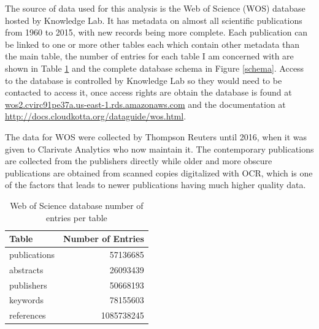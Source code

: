 \documentclass[12pt, a4paper]{article}
\begin{document}
The source of data used for this analysis is the  Web of Science (WOS) database hosted by Knowledge Lab. It has metadata on almost all scientific publications from 1960 to 2015, with new records being more complete. Each publication can be linked to one or more other tables each which contain other metadata than the main table, the number of entries for each table I am concerned with are shown in Table \ref{wos} and the complete database schema in Figure \ref{schema}. Access to the database is controlled by Knowledge Lab so they would need to be contacted to access it, once access rights are obtain the database is found at \href{wos2.cvirc91pe37a.us-east-1.rds.amazonaws.com}{wos2.cvirc91pe37a.us-east-1.rds.amazonaws.com} and the documentation at \href{http://docs.cloudkotta.org/dataguide/wos.html}{http://docs.cloudkotta.org/dataguide/wos.html}.

The data for WOS were collected by Thompson Reuters until 2016, when it was given to  Clarivate Analytics who now maintain it. The contemporary publications are collected from the publishers directly while older and more obscure publications are obtained from scanned copies digitalized with OCR, which is one of the factors that leads to newer publications having much higher quality data.

\begin{table} [!ht]
	\centering
	\begin{tabular}{lr}
		\toprule
		Table & Number of Entries\\
		\midrule
		publications & 57136685\\
		abstracts &	26093439\\
		publishers & 50668193\\
		keywords &	78155603\\
		references &	1085738245\\
		\bottomrule
	\end{tabular}
	\caption{Web of Science database number of entries per table}\label{wos}
\end{table}
\end{document}
